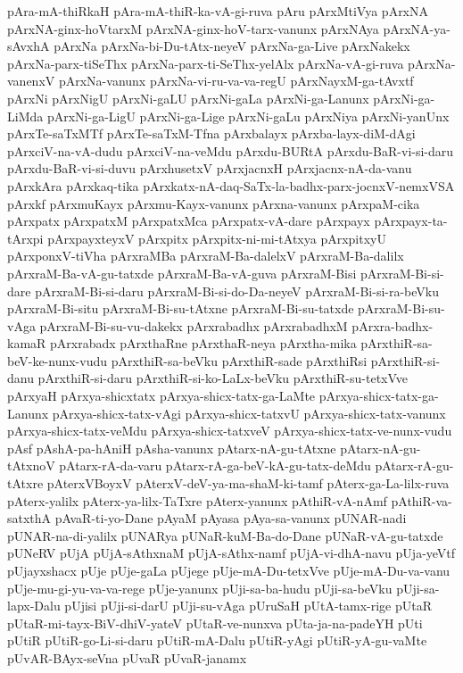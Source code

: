 {pAra-mA-thiRkaH
pAra-mA-thiR-ka-vA-gi-ruva
pAru
pArxMtiVya
pArxNA
pArxNA-ginx-hoVtarxM
pArxNA-ginx-hoV-tarx-vanunx
pArxNAya
pArxNA-ya-sAvxhA
pArxNa
pArxNa-bi-Du-tAtx-neyeV
pArxNa-ga-Live
pArxNakekx
pArxNa-parx-tiSeThx
pArxNa-parx-ti-SeThx-yelAlx
pArxNa-vA-gi-ruva
pArxNa-vanenxV
pArxNa-vanunx
pArxNa-vi-ru-va-va-regU
pArxNayxM-ga-tAvxtf
pArxNi
pArxNigU
pArxNi-gaLU
pArxNi-gaLa
pArxNi-ga-Lanunx
pArxNi-ga-LiMda
pArxNi-ga-LigU
pArxNi-ga-Lige
pArxNi-gaLu
pArxNiya
pArxNi-yanUnx
pArxTe-saTxMTf
pArxTe-saTxM-Tfna
pArxbalayx
pArxba-layx-diM-dAgi
pArxciV-na-vA-dudu
pArxciV-na-veMdu
pArxdu-BURtA
pArxdu-BaR-vi-si-daru
pArxdu-BaR-vi-si-duvu
pArxhusetxV
pArxjacnxH
pArxjacnx-nA-da-vanu
pArxkAra
pArxkaq-tika
pArxkatx-nA-daq-SaTx-la-badhx-parx-jocnxV-nemxVSA
pArxkf
pArxmuKayx
pArxmu-Kayx-vanunx
pArxna-vanunx
pArxpaM-cika
pArxpatx
pArxpatxM
pArxpatxMca
pArxpatx-vA-dare
pArxpayx
pArxpayx-ta-tArxpi
pArxpayxteyxV
pArxpitx
pArxpitx-ni-mi-tAtxya
pArxpitxyU
pArxponxV-tiVha
pArxraMBa
pArxraM-Ba-dalelxV
pArxraM-Ba-dalilx
pArxraM-Ba-vA-gu-tatxde
pArxraM-Ba-vA-guva
pArxraM-Bisi
pArxraM-Bi-si-dare
pArxraM-Bi-si-daru
pArxraM-Bi-si-do-Da-neyeV
pArxraM-Bi-si-ra-beVku
pArxraM-Bi-situ
pArxraM-Bi-su-tAtxne
pArxraM-Bi-su-tatxde
pArxraM-Bi-su-vAga
pArxraM-Bi-su-vu-dakekx
pArxrabadhx
pArxrabadhxM
pArxra-badhx-kamaR
pArxrabadx
pArxthaRne
pArxthaR-neya
pArxtha-mika
pArxthiR-sa-beV-ke-nunx-vudu
pArxthiR-sa-beVku
pArxthiR-sade
pArxthiRsi
pArxthiR-si-danu
pArxthiR-si-daru
pArxthiR-si-ko-LaLx-beVku
pArxthiR-su-tetxVve
pArxyaH
pArxya-shicxtatx
pArxya-shicx-tatx-ga-LaMte
pArxya-shicx-tatx-ga-Lanunx
pArxya-shicx-tatx-vAgi
pArxya-shicx-tatxvU
pArxya-shicx-tatx-vanunx
pArxya-shicx-tatx-veMdu
pArxya-shicx-tatxveV
pArxya-shicx-tatx-ve-nunx-vudu
pAsf
pAshA-pa-hAniH
pAsha-vanunx
pAtarx-nA-gu-tAtxne
pAtarx-nA-gu-tAtxnoV
pAtarx-rA-da-varu
pAtarx-rA-ga-beV-kA-gu-tatx-deMdu
pAtarx-rA-gu-tAtxre
pAterxVBoyxV
pAterxV-deV-ya-ma-shaM-ki-tamf
pAterx-ga-La-lilx-ruva
pAterx-yalilx
pAterx-ya-lilx-TaTxre
pAterx-yanunx
pAthiR-vA-nAmf
pAthiR-va-satxthA
pAvaR-ti-yo-Dane
pAyaM
pAyasa
pAya-sa-vanunx
pUNAR-nadi
pUNAR-na-di-yalilx
pUNARya
pUNaR-kuM-Ba-do-Dane
pUNaR-vA-gu-tatxde
pUNeRV
pUjA
pUjA-sAthxnaM
pUjA-sAthx-namf
pUjA-vi-dhA-navu
pUja-yeVtf
pUjayxshacx
pUje
pUje-gaLa
pUjege
pUje-mA-Du-tetxVve
pUje-mA-Du-va-vanu
pUje-mu-gi-yu-va-va-rege
pUje-yanunx
pUji-sa-ba-hudu
pUji-sa-beVku
pUji-sa-lapx-Dalu
pUjisi
pUji-si-darU
pUji-su-vAga
pUruSaH
pUtA-tamx-rige
pUtaR
pUtaR-mi-tayx-BiV-dhiV-yateV
pUtaR-ve-nunxva
pUta-ja-na-padeYH
pUti
pUtiR
pUtiR-go-Li-si-daru
pUtiR-mA-Dalu
pUtiR-yAgi
pUtiR-yA-gu-vaMte
pUvAR-BAyx-seVna
pUvaR
pUvaR-janamx
}
